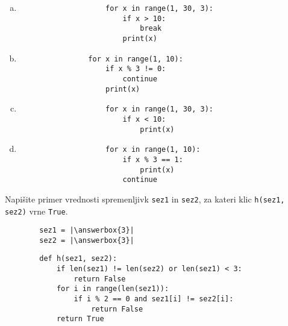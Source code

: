 \documentclass[arhiv, 10pt]{../izpit}
\newcommand{\inlinepy}[1]{\texttt{#1}}
\newcommand{\answerbox}[1]{\framebox{\vphantom{\large M}\hspace{#1cm}}}
\begin{document}
        \begin{multicols}{2}
        \begin{enumerate}[(a)]
\item 
                \begin{verbatim}
                    for x in range(1, 30, 3):
                        if x > 10:
                            break
                        print(x)
                \end{verbatim}
            
\item 
            \begin{verbatim}
                for x in range(1, 10):
                    if x % 3 != 0:
                        continue
                    print(x)
            \end{verbatim}
        
\item 
                \begin{verbatim}
                    for x in range(1, 30, 3):
                        if x < 10:
                            print(x)
                \end{verbatim}
            
\item 
                \begin{verbatim}
                    for x in range(1, 10):
                        if x % 3 == 1:
                            print(x)
                        continue
                \end{verbatim}
            
\end{enumerate}

        \end{multicols}
    
        \naloga*
        \begin{multicols}{2}
        \noindent
        Napišite primer vrednosti spremenljivk \inlinepy{sez1} in \inlinepy{sez2}, za kateri klic \inlinepy{h(sez1, sez2)} vrne \inlinepy{True}.
        \begin{verbatim}
        sez1 = |\answerbox{3}|
        sez2 = |\answerbox{3}|
        \end{verbatim}
        \vfil
        \columnbreak
        \begin{verbatim}
        def h(sez1, sez2):
            if len(sez1) != len(sez2) or len(sez1) < 3:
                return False
            for i in range(len(sez1)):
                if i % 2 == 0 and sez1[i] != sez2[i]:
                    return False
            return True
        \end{verbatim}
        \end{multicols}
    
\end{document}

